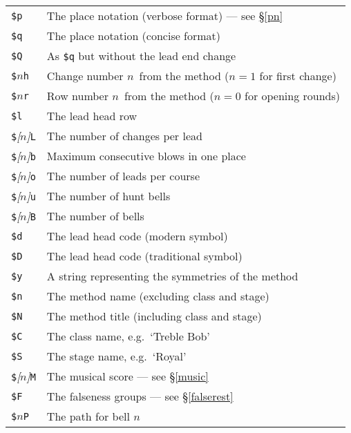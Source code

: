 \documentclass[a4paper,11pt,oneside]{book}
\makeatletter
\newcommand{\fspecd}[1]{\index{#1@{\hspace*{-\fspecwidth}\texttt{\$#1}}|ulink}}
\newcommand{\sref}[1]{\hyperref[#1]{\S\ref{#1}}}
\makeatother
\begin{document}
{\def\D{\texttt{\$}}\def\N{$n$\/}\def\No{\textit{[$n$]}\/}
\def\F#1{\texttt{#1}\fspecd{#1}}
\begin{tabularx}{\textwidth}{lX}
\D\F{p}&The place notation (verbose format) --- see \sref{pn}\\
\D\F{q}&The place notation (concise format)\\
\D\F{Q}&As \texttt{\$q} but without the lead end change%
  \index{place notation!printing|see{\texttt{\$p}, %
    \texttt{\$q} \textit{and} \texttt{\$Q}}}\\
\D\N\F{h}&Change number \N\ from the method ($n=1$ for first change)%
  \index{changes, printing|see{\texttt{\$h}}}\\
\D\N\F{r}&Row number \N\ from the method ($n=0$ for opening rounds)%
  \index{rows, printing|see{\texttt{\$r}}}\\
\D\F{l}&The lead head row%
  \index{lead head!printing|see{\texttt{\$l}}}\\
\D\No\F{L}&The number of changes per lead%
  \index{lead length!printing|see{\texttt{\$L}}}\\
\D\No\F{b}&Maximum consecutive blows in one place%
  \index{blows, maximum consecutive!printing|see{\texttt{\$b}}}\\
\D\No\F{o}&The number of leads per course\\
\D\No\F{u}&The number of hunt bells\\
\D\No\F{B}&The number of bells\\
\D\F{d}&The lead head code (modern symbol)\\
\D\F{D}&The lead head code (traditional symbol)
  \index{lead head!code|see{\texttt{\$d} \textit{and} \texttt{\$D}}}\\
\D\F{y}&A string representing the symmetries of the method%
  \index{symmetry!printing|see{\texttt{\$y}}}\\
\D\F{n}&The method name (excluding class and stage)\\
\D\F{N}&The method title (including class and stage)\\
\D\F{C}&The class name, e.g.\ `Treble Bob'%
  \index{class!printing name|see{\texttt{\$C}}}\\
\D\F{S}&The stage name, e.g.\ `Royal'%
  \index{stage!printing name|see{\texttt{\$S}}}\\
\D\No\F{M}&The musical score --- see \sref{music}\\
\D\F{F}&The falseness groups --- see \sref{falserest}\\
\D\N\F{P}&The path for bell \N\\

\end{tabularx}}
\end{document}
